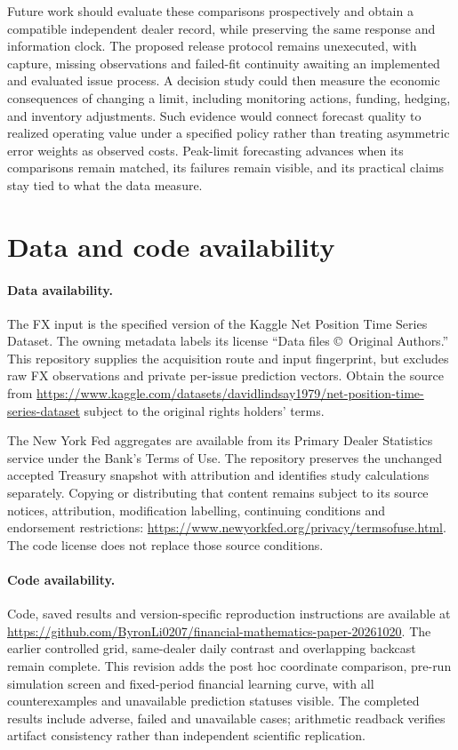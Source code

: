 \documentclass[11pt,a4paper]{article}
\begin{document}
Future work should evaluate these comparisons prospectively and obtain a compatible independent dealer record, while preserving the same response and information clock. The proposed release protocol remains unexecuted, with capture, missing observations and failed-fit continuity awaiting an implemented and evaluated issue process. A decision study could then measure the economic consequences of changing a limit, including monitoring actions, funding, hedging, and inventory adjustments. Such evidence would connect forecast quality to realized operating value under a specified policy rather than treating asymmetric error weights as observed costs. Peak-limit forecasting advances when its comparisons remain matched, its failures remain visible, and its practical claims stay tied to what the data measure.


\FloatBarrier

\section*{Data and code availability}
\paragraph{Data availability.} The FX input is the specified version of the Kaggle Net Position Time Series Dataset. The owning metadata labels its license ``Data files \copyright\ Original Authors.'' This repository supplies the acquisition route and input fingerprint, but excludes raw FX observations and private per-issue prediction vectors. Obtain the source from \url{https://www.kaggle.com/datasets/davidlindsay1979/net-position-time-series-dataset} subject to the original rights holders' terms.

The New York Fed aggregates are available from its Primary Dealer Statistics service under the Bank's Terms of Use. The repository preserves the unchanged accepted Treasury snapshot with attribution and identifies study calculations separately. Copying or distributing that content remains subject to its source notices, attribution, modification labelling, continuing conditions and endorsement restrictions: \url{https://www.newyorkfed.org/privacy/termsofuse.html}. The code license does not replace those source conditions.

\paragraph{Code availability.} Code, saved results and version-specific reproduction instructions are available at \url{https://github.com/ByronLi0207/financial-mathematics-paper-20261020}. The earlier controlled grid, same-dealer daily contrast and overlapping backcast remain complete. This revision adds the post hoc coordinate comparison, pre-run simulation screen and fixed-period financial learning curve, with all counterexamples and unavailable prediction statuses visible. The completed results include adverse, failed and unavailable cases; arithmetic readback verifies artifact consistency rather than independent scientific replication.
\end{document}
